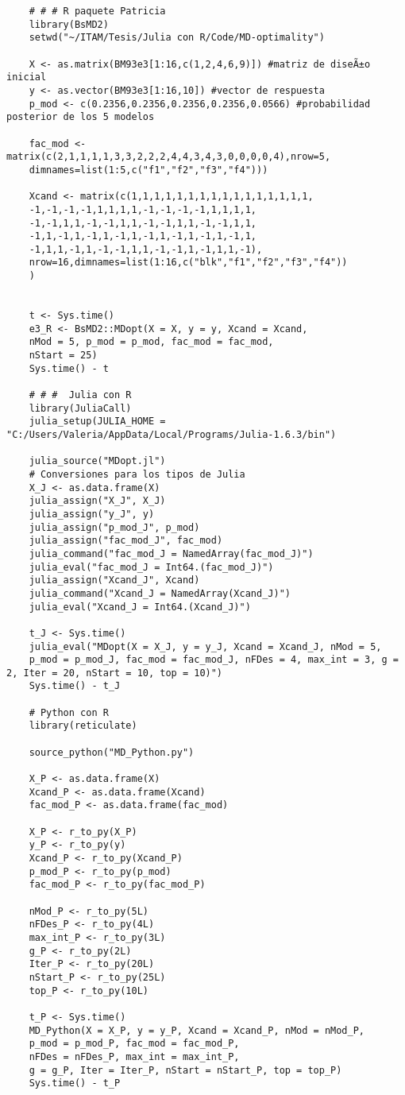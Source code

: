 \begin{verbatim}
	# # # R paquete Patricia
	library(BsMD2)
	setwd("~/ITAM/Tesis/Julia con R/Code/MD-optimality")
	
	X <- as.matrix(BM93e3[1:16,c(1,2,4,6,9)]) #matriz de diseÃ±o inicial
	y <- as.vector(BM93e3[1:16,10]) #vector de respuesta
	p_mod <- c(0.2356,0.2356,0.2356,0.2356,0.0566) #probabilidad posterior de los 5 modelos
	
	fac_mod <- matrix(c(2,1,1,1,1,3,3,2,2,2,4,4,3,4,3,0,0,0,0,4),nrow=5,
	dimnames=list(1:5,c("f1","f2","f3","f4")))
	
	Xcand <- matrix(c(1,1,1,1,1,1,1,1,1,1,1,1,1,1,1,1,
	-1,-1,-1,-1,1,1,1,1,-1,-1,-1,-1,1,1,1,1,
	-1,-1,1,1,-1,-1,1,1,-1,-1,1,1,-1,-1,1,1,
	-1,1,-1,1,-1,1,-1,1,-1,1,-1,1,-1,1,-1,1,
	-1,1,1,-1,1,-1,-1,1,1,-1,-1,1,-1,1,1,-1),
	nrow=16,dimnames=list(1:16,c("blk","f1","f2","f3","f4"))
	)
	
	
	t <- Sys.time()
	e3_R <- BsMD2::MDopt(X = X, y = y, Xcand = Xcand,
	nMod = 5, p_mod = p_mod, fac_mod = fac_mod, 
	nStart = 25)
	Sys.time() - t
	
	# # #  Julia con R
	library(JuliaCall)
	julia_setup(JULIA_HOME = "C:/Users/Valeria/AppData/Local/Programs/Julia-1.6.3/bin")
	
	julia_source("MDopt.jl")
	# Conversiones para los tipos de Julia
	X_J <- as.data.frame(X)
	julia_assign("X_J", X_J)
	julia_assign("y_J", y)
	julia_assign("p_mod_J", p_mod)
	julia_assign("fac_mod_J", fac_mod)
	julia_command("fac_mod_J = NamedArray(fac_mod_J)")
	julia_eval("fac_mod_J = Int64.(fac_mod_J)")
	julia_assign("Xcand_J", Xcand)
	julia_command("Xcand_J = NamedArray(Xcand_J)")
	julia_eval("Xcand_J = Int64.(Xcand_J)")
	
	t_J <- Sys.time()
	julia_eval("MDopt(X = X_J, y = y_J, Xcand = Xcand_J, nMod = 5, 
	p_mod = p_mod_J, fac_mod = fac_mod_J, nFDes = 4, max_int = 3, g = 2, Iter = 20, nStart = 10, top = 10)")
	Sys.time() - t_J
	
	# Python con R
	library(reticulate)
	
	source_python("MD_Python.py")
	
	X_P <- as.data.frame(X)
	Xcand_P <- as.data.frame(Xcand)
	fac_mod_P <- as.data.frame(fac_mod)
	
	X_P <- r_to_py(X_P)
	y_P <- r_to_py(y) 
	Xcand_P <- r_to_py(Xcand_P)
	p_mod_P <- r_to_py(p_mod)
	fac_mod_P <- r_to_py(fac_mod_P)
	
	nMod_P <- r_to_py(5L)
	nFDes_P <- r_to_py(4L)
	max_int_P <- r_to_py(3L)
	g_P <- r_to_py(2L)
	Iter_P <- r_to_py(20L)
	nStart_P <- r_to_py(25L)
	top_P <- r_to_py(10L)
	
	t_P <- Sys.time()
	MD_Python(X = X_P, y = y_P, Xcand = Xcand_P, nMod = nMod_P, 
	p_mod = p_mod_P, fac_mod = fac_mod_P, 
	nFDes = nFDes_P, max_int = max_int_P, 
	g = g_P, Iter = Iter_P, nStart = nStart_P, top = top_P)
	Sys.time() - t_P
\end{verbatim}

